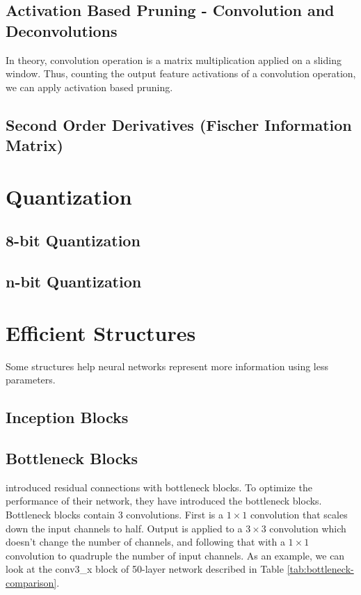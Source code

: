 \subsection{Activation Based Pruning - Convolution and Deconvolutions}
In theory, convolution operation is a matrix multiplication applied on a sliding window. Thus, counting the output feature activations of a convolution operation, we can apply activation based pruning. 

\subsection{Second Order Derivatives (Fischer Information Matrix)}

\section{Quantization}

\subsection{8-bit Quantization}
\subsection{n-bit Quantization}

\section{Efficient Structures}
Some structures help neural networks represent more information using less parameters.

\subsection{Inception Blocks}
\subsection{Bottleneck Blocks}
\cite{He:2015aa} introduced residual connections with bottleneck blocks. To optimize the performance of their network, they have introduced the bottleneck blocks. Bottleneck blocks contain 3 convolutions. First is a $ 1 \times 1$ convolution that scales down the input channels to half. Output is applied to a $3 \times 3$ convolution which doesn't change the number of channels, and following that with a $1 \times 1$ convolution to quadruple the number of input channels. As an example, we can look at the conv3\_x block of 50-layer network described in Table \ref{tab:bottleneck-comparison}.


